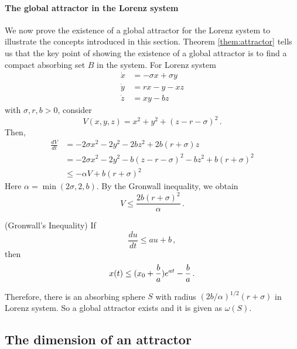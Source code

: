 \paragraph{The global attractor in the Lorenz system}
We now prove the existence of a global attractor for the Lorenz system
to illustrate the concepts introduced in this section.
Theorem \ref{them:attractor} tells us that the key point of showing the
existence of a global attractor is to find a compact absorbing set $B$
in the system. For Lorenz system
\begin{align*}
  \dot{x} & = -\sigma x + \sigma y \\
  \dot{y} & = rx - y - xz \\
  \dot{z} & = xy - bz
\end{align*}
with $\sigma, r, b > 0$, consider
\[
  V(x, y, z) = x^2 + y^2 + (z-r-\sigma)^2
  \,.
\]
Then,
\begin{align*}
  \frac{dV}{dt}
  & = -2\sigma x^2 - 2y^2 - 2bz^2 + 2b(r+\sigma)z \\
  & = -2\sigma x^2 - 2y^2 - b(z-r-\sigma)^2 -bz^2 + b(r+\sigma)^2 \\
  & \le -\alpha V + b(r+\sigma)^2
\end{align*}
Here $\alpha = \min(2\sigma, 2, b)$.
By the Gronwall inequality, we obtain
\[
  V \le \frac{2b(r+\sigma)^2}{\alpha}
  \,.
\]
\begin{lemma}
  (Gronwall's Inequality) If
  \[
    \frac{du}{dt} \le au+b
    \,,
  \]
  then
  \[
    x(t) \le (x_0 + \frac{b}{a})e^{at} - \frac{b}{a}
    \,.
  \]
  \label{lem:Gronwall}
\end{lemma}
Therefore, there is an absorbing sphere
$S$ with radius $(2b/\alpha)^{1/2}(r+\sigma)$ in Lorenz system.
So a global attractor exists and it is given as $\omega(S)$.

\subsection{The dimension of an attractor}

